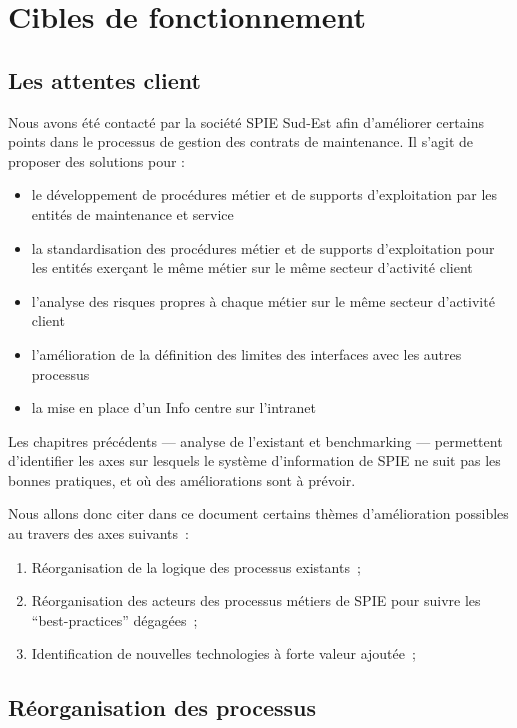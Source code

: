 \chapter{Cibles de fonctionnement}

\section{Les attentes client}

Nous avons été contacté par la société SPIE Sud-Est afin d'améliorer certains points dans le processus de gestion des contrats de maintenance. Il s'agit de proposer des solutions pour :

\begin{itemize}
    \item le développement de procédures métier et de supports d'exploitation par les entités de maintenance et service
    \item la standardisation des procédures métier et de supports d'exploitation pour les entités exerçant le même métier sur le même secteur d'activité client
    \item l'analyse des risques propres à chaque métier sur le même secteur d'activité client
    \item l'amélioration de la définition des limites des interfaces avec les autres processus
    \item la mise en place d'un Info centre sur l'intranet
\end{itemize}

Les chapitres précédents --- analyse de l'existant et benchmarking --- permettent d'identifier les axes sur lesquels le système d'information de SPIE ne suit pas les bonnes pratiques, et où des améliorations sont à prévoir.

    Nous allons donc citer dans ce document certains thèmes d'amélioration possibles au travers des axes suivants~:

    \begin{enumerate}
        \item Réorganisation de la logique des processus existants~;
        \item Réorganisation des acteurs des processus métiers de SPIE pour suivre les ``best-practices'' dégagées~;
        \item Identification de nouvelles technologies à forte valeur ajoutée~;
    \end{enumerate}

\section{Réorganisation des processus}

